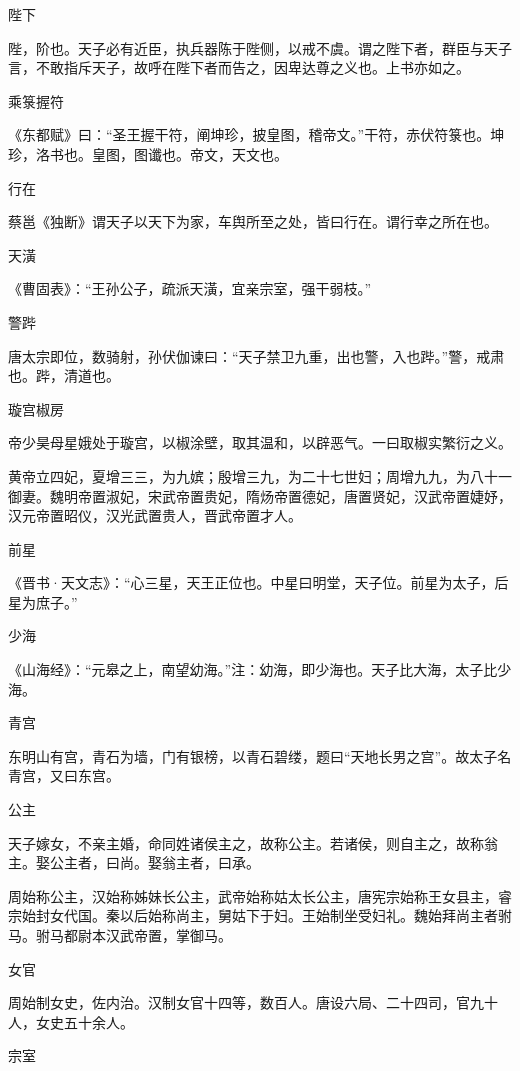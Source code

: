 \documentclass[a4paper,12pt,UTF8,twoside]{ctexbook}
\begin{document}
    陛下
    
    陛，阶也。天子必有近臣，执兵器陈于陛侧，以戒不虞。谓之陛下者，群臣与天子言，不敢指斥天子，故呼在陛下者而告之，因卑达尊之义也。上书亦如之。
    
    乘箓握符
    
    《东都赋》曰：“圣王握干符，阐坤珍，披皇图，稽帝文。”干符，赤伏符箓也。坤珍，洛书也。皇图，图谶也。帝文，天文也。
    
    行在
    
    蔡邕《独断》谓天子以天下为家，车舆所至之处，皆曰行在。谓行幸之所在也。
    
    天潢
    
    《曹固表》：“王孙公子，疏派天潢，宜亲宗室，强干弱枝。”
    
    警跸
    
    唐太宗即位，数骑射，孙伏伽谏曰：“天子禁卫九重，出也警，入也跸。”警，戒肃也。跸，清道也。
    
    璇宫椒房
    
    帝少昊母星娥处于璇宫，以椒涂壁，取其温和，以辟恶气。一曰取椒实繁衍之义。
    
    黄帝立四妃，夏增三三，为九嫔；殷增三九，为二十七世妇；周增九九，为八十一御妻。魏明帝置淑妃，宋武帝置贵妃，隋炀帝置德妃，唐置贤妃，汉武帝置婕妤，汉元帝置昭仪，汉光武置贵人，晋武帝置才人。
    
    前星
    
    《晋书·天文志》：“心三星，天王正位也。中星曰明堂，天子位。前星为太子，后星为庶子。”
    
    少海
    
    《山海经》：“元皋之上，南望幼海。”注：幼海，即少海也。天子比大海，太子比少海。
    
    青宫
    
    东明山有宫，青石为墙，门有银榜，以青石碧缕，题曰“天地长男之宫”。故太子名青宫，又曰东宫。
    
    公主
    
    天子嫁女，不亲主婚，命同姓诸侯主之，故称公主。若诸侯，则自主之，故称翁主。娶公主者，曰尚。娶翁主者，曰承。
    
    周始称公主，汉始称姊妹长公主，武帝始称姑太长公主，唐宪宗始称王女县主，睿宗始封女代国。秦以后始称尚主，舅姑下于妇。王始制坐受妇礼。魏始拜尚主者驸马。驸马都尉本汉武帝置，掌御马。
    
    女官
    
    周始制女史，佐内治。汉制女官十四等，数百人。唐设六局、二十四司，官九十人，女史五十余人。
    
    宗室
    
\end{document}
